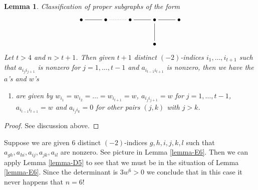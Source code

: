 \documentclass{stacks-project}
\theoremstyle{plain}
\newtheorem{lemma}[subsection]{Lemma}
\theoremstyle{definition}
\theoremstyle{remark}
\numberwithin{equation}{subsection}
\begin{document}
\begin{lemma}
\label{lemma-Dn}
Classification of proper subgraphs of the form
$$
\xymatrix{
\bullet \ar@{-}[r] & \bullet \ar@{..}[r] & \bullet \ar@{-}[r] &
\bullet \ar@{-}[r] \ar@{-}[d] & \bullet \\
& & & \bullet
}
$$
Let $t > 4$ and $n > t + 1$. Then given $t + 1$ distinct
$(-2)$-indices $i_1, \ldots, i_{t + 1}$ such that $a_{i_ji_{j + 1}}$
is nonzero for $j = 1, \ldots, t - 1$ and $a_{i_{t - 1}i_{t + 1}}$
is nonzero, then we have the $a$'s and $w$'s
\begin{enumerate}
\item
\label{item-Dn}
are given by $w_{i_1} = w_{i_2} = \ldots = w_{i_{t + 1}} = w$,
$a_{i_ji_{j + 1}} = w$ for $j = 1, \ldots, t - 1$,
$a_{i_{t - 1}i_{t + 1}} = w$ and $a_{i_ji_k} = 0$ for other
pairs $(j, k)$ with $j > k$.
\end{enumerate}
\end{lemma}

\begin{proof}
See discussion above.
\end{proof}

\noindent
Suppose we are given $6$ distinct $(-2)$-indices $g, h, i, j, k, l$
such that $a_{gh}, a_{hi}, a_{ij}, a_{jk}, a_{il}$ are nonzero.
See picture in Lemma \ref{lemma-E6}. Then we can apply
Lemma \ref{lemma-D5} to see that we must be in the situation
of Lemma \ref{lemma-E6}. Since the determinant is $3w^6 > 0$
we conclude that in this case it never happens that $n = 6$!
\end{document}
